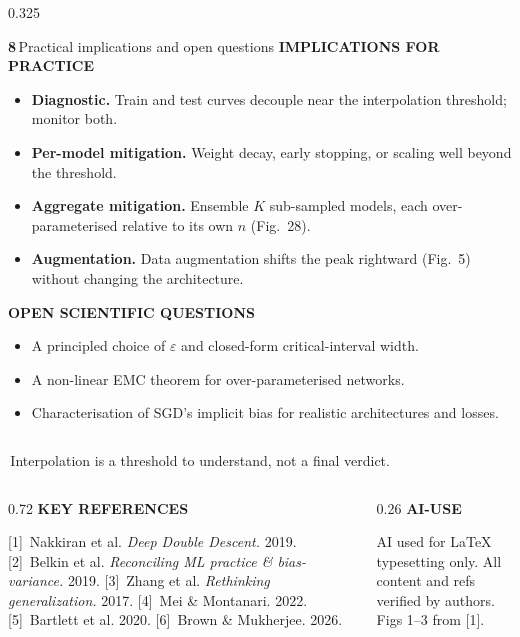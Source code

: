 \documentclass[final]{beamer}
\newcommand{\sectnum}[1]{\textcolor{accentgold}{\bfseries #1}\,}
\newcommand{\kw}[1]{\textcolor{uompurple}{\textbf{#1}}}
\newcommand{\eyebrow}[1]{{\color{uompurple}\scriptsize\bfseries\MakeUppercase{#1}}\par\vspace{-0.2ex}}
\newcommand{\bigtakeaway}[1]{%
  \par\noindent\colorbox{uompurple}{\parbox{\linewidth-2\fboxsep}{\centering\bfseries\Large\color{white}\strut\,#1\,\strut}}\par}
\begin{document}
\begin{frame}[t]{}
\begin{columns}[T,onlytextwidth]
\begin{column}{0.325\linewidth}
\begin{block}{\sectnum{8}Practical implications and open questions}
\eyebrow{Implications for practice}
\begin{itemize}\setlength\itemsep{0.2ex}
\item \kw{Diagnostic.} Train and test curves decouple near the interpolation threshold; monitor both.
\item \kw{Per-model mitigation.} Weight decay, early stopping, or scaling well beyond the threshold.
\item \kw{Aggregate mitigation.} Ensemble \(K\) sub-sampled models, each over-parameterised relative to its own \(n\) (Fig.~28).
\item \kw{Augmentation.} Data augmentation shifts the peak rightward (Fig.~5) without changing the architecture.
\end{itemize}
\eyebrow{Open scientific questions}
\begin{itemize}\setlength\itemsep{0.2ex}
\item A principled choice of \(\varepsilon\) and closed-form critical-interval width.
\item A non-linear EMC theorem for over-parameterised networks.
\item Characterisation of SGD's implicit bias for realistic architectures and losses.
\end{itemize}
\end{block}
\end{column}

\end{columns}

\vspace{0.05cm}
\bigtakeaway{Interpolation is a threshold to understand, not a final verdict.}
\vspace{0.1cm}

\begin{columns}[T,onlytextwidth]
\begin{column}{0.72\linewidth}
\eyebrow{Key references} \scriptsize
[1]~Nakkiran et al. \emph{Deep Double Descent.} 2019.
[2]~Belkin et al. \emph{Reconciling ML practice \& bias-variance.} 2019.
[3]~Zhang et al. \emph{Rethinking generalization.} 2017.
[4]~Mei \& Montanari. 2022.
[5]~Bartlett et al. 2020.
[6]~Brown \& Mukherjee. 2026.
\end{column}
\begin{column}{0.26\linewidth}
\eyebrow{AI-use} \scriptsize
AI used for \LaTeX{} typesetting only. All content and refs verified by authors. Figs 1--3 from [1].
\end{column}
\end{columns}

\end{frame}
\end{document}
